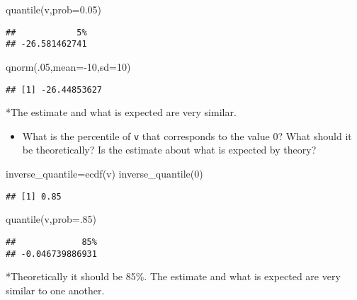 \documentclass[
]{article}
\newenvironment{Shaded}{\begin{snugshade}}{\end{snugshade}}
\newcommand{\AttributeTok}[1]{\textcolor[rgb]{0.77,0.63,0.00}{#1}}
\newcommand{\DecValTok}[1]{\textcolor[rgb]{0.00,0.00,0.81}{#1}}
\newcommand{\FloatTok}[1]{\textcolor[rgb]{0.00,0.00,0.81}{#1}}
\newcommand{\FunctionTok}[1]{\textcolor[rgb]{0.00,0.00,0.00}{#1}}
\newcommand{\NormalTok}[1]{#1}
\newcommand{\OtherTok}[1]{\textcolor[rgb]{0.56,0.35,0.01}{#1}}
\newcommand{\SpecialCharTok}[1]{\textcolor[rgb]{0.00,0.00,0.00}{#1}}
\providecommand{\tightlist}{%
  \setlength{\itemsep}{0pt}\setlength{\parskip}{0pt}}
\begin{document}
\begin{Shaded}
\begin{Highlighting}[]
\FunctionTok{quantile}\NormalTok{(v,}\AttributeTok{prob=}\FloatTok{0.05}\NormalTok{)}
\end{Highlighting}
\end{Shaded}

\begin{verbatim}
##            5% 
## -26.581462741
\end{verbatim}

\begin{Shaded}
\begin{Highlighting}[]
\FunctionTok{qnorm}\NormalTok{(.}\DecValTok{05}\NormalTok{,}\AttributeTok{mean=}\SpecialCharTok{{-}}\DecValTok{10}\NormalTok{,}\AttributeTok{sd=}\DecValTok{10}\NormalTok{)}
\end{Highlighting}
\end{Shaded}

\begin{verbatim}
## [1] -26.44853627
\end{verbatim}

*The estimate and what is expected are very similar.

\begin{itemize}
\tightlist
\item
  What is the percentile of \texttt{v} that corresponds to the value 0?
  What should it be theoretically? Is the estimate about what is
  expected by theory?
\end{itemize}

\begin{Shaded}
\begin{Highlighting}[]
\NormalTok{inverse\_quantile}\OtherTok{=}\FunctionTok{ecdf}\NormalTok{(v)}
\FunctionTok{inverse\_quantile}\NormalTok{(}\DecValTok{0}\NormalTok{)}
\end{Highlighting}
\end{Shaded}

\begin{verbatim}
## [1] 0.85
\end{verbatim}

\begin{Shaded}
\begin{Highlighting}[]
\FunctionTok{quantile}\NormalTok{(v,}\AttributeTok{prob=}\NormalTok{.}\DecValTok{85}\NormalTok{)}
\end{Highlighting}
\end{Shaded}

\begin{verbatim}
##             85% 
## -0.046739886931
\end{verbatim}

*Theoretically it should be 85\%. The estimate and what is expected are
very similar to one another.
\end{document}
